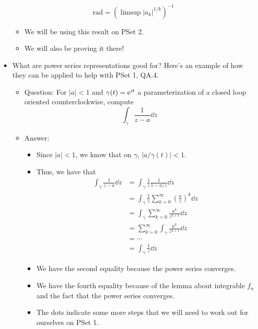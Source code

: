 \documentclass[../notes.tex]{subfiles}
\begin{document}
\begin{itemize}
    \begin{equation*}
        \text{rad} = (\limsup|a_k|^{1/k})^{-1}
    \end{equation*}
    \begin{itemize}
        \item We will be using this result on PSet 2.
        \item We will also be proving it there!
    \end{itemize}
    \item What are power series representations good for? Here's an example of how they can be applied to help with PSet 1, QA.4.
    \begin{itemize}
        \item Question: For $|a|<1$ and $\gamma(t)=\e[it]$ a parameterization of a closed loop oriented counterclockwise, compute
        \begin{equation*}
            \int_\gamma\frac{1}{z-a}\dd{z}
        \end{equation*}
        \item Answer:
        \begin{itemize}
            \item Since $|a|<1$, we know that on $\gamma$, $|a/\gamma(t)|<1$.
            \item Thus, we have that
            \begin{align*}
                \int_\gamma\frac{1}{z-a}\dd{z} &= \int_\gamma\frac{1}{z}\frac{1}{1-a/z}\dd{z}\\
                &= \int_\gamma\frac{1}{z}\sum_{k=0}^\infty\left( \frac{a}{z} \right)^k\dd{z}\\
                &= \int_\gamma\sum_{k=0}^\infty\frac{a^k}{z^{k+1}}\dd{z}\\
                &= \sum_{k=0}^\infty\int_\gamma\frac{a^k}{z^{k+1}}\dd{z}\\
                &= \cdots\\
                &= \int_\gamma\frac{1}{z}\dd{z}
            \end{align*}
            \item We have the second equality because the power series converges.
            \item We have the fourth equality because of the lemma about integrable $f_n$ and the fact that the power series converges.
            \item The dots indicate some more steps that we will need to work out for ourselves on PSet 1.
        \end{itemize}

\end{itemize}
\end{itemize}
\end{document}
